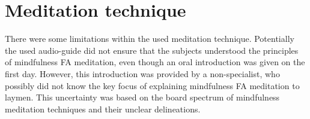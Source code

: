 \section{Meditation technique}
%



There were some limitations within the used meditation technique. Potentially the used audio-guide did not ensure that the subjects understood the principles of mindfulness FA meditation, even though an oral introduction was given on the first day. However, this introduction was provided by a non-specialist, who possibly did not know the key focus of explaining mindfulness FA meditation to laymen. This uncertainty was based on the board spectrum of mindfulness meditation techniques and their unclear delineations.

